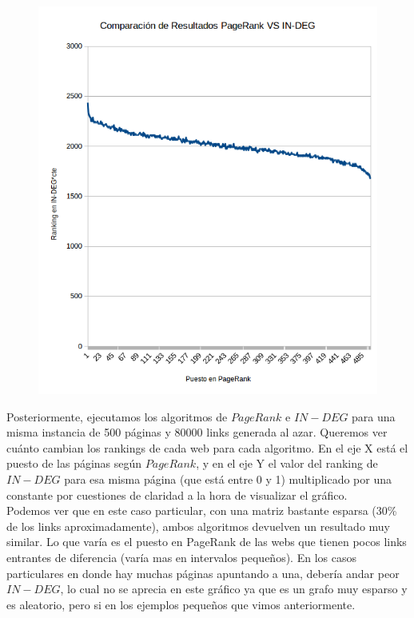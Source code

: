 \begin{figure}
  \vspace{-20pt}
  \begin{center}
    \includegraphics[scale= 0.6]{imagenes/pagerankVSindeg.png}
  \end{center}
  \vspace{-10pt}
  \vspace{-10pt}
\end{figure}

Posteriormente, ejecutamos los algoritmos de $PageRank$ e $IN-DEG$ para una misma instancia de 500 páginas y 80000 links generada al azar. Queremos ver cuánto cambian los rankings de cada web para cada algoritmo. En el eje X está el puesto de las páginas según $PageRank$, y en el eje Y el valor del ranking de $IN-DEG$ para esa misma página (que está entre 0 y 1) multiplicado por una constante por cuestiones de claridad a la hora de visualizar el gráfico.\\


Podemos ver que en este caso particular, con una matriz bastante esparsa (30\% de los links aproximadamente), ambos algoritmos devuelven un resultado muy similar. Lo que varía es el puesto en PageRank de las webs que tienen pocos links entrantes de diferencia (varía mas en intervalos pequeños). En los casos particulares en donde hay muchas páginas apuntando a una, debería andar peor $IN-DEG$, lo cual no se aprecia en este gráfico ya que es un grafo muy esparso y es aleatorio, pero si en los ejemplos pequeños que vimos anteriormente.\\


